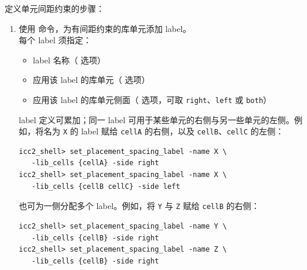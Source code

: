 定义单元间距约束的步骤：
\begin{enumerate}
  \item 使用  命令，为有间距约束的库单元添加 label。\\
        每个 label 须指定：
        \begin{itemize}
          \item label 名称（ 选项）
          \item 应用该 label 的库单元（ 选项）
          \item 应用该 label 的库单元侧面（ 选项，可取 \texttt{right}、\texttt{left} 或 \texttt{both}）
        \end{itemize}
        label 定义可累加；同一 label 可用于某些单元的右侧与另一些单元的左侧。例如，将名为 \texttt{X} 的 label 赋给 \texttt{cellA} 的右侧，以及 \texttt{cellB}、\texttt{cellC} 的左侧：
\begin{lstlisting}
icc2_shell> set_placement_spacing_label -name X \
   -lib_cells {cellA} -side right
icc2_shell> set_placement_spacing_label -name X \
   -lib_cells {cellB cellC} -side left
\end{lstlisting}
        也可为一侧分配多个 label。例如，将 \texttt{Y} 与 \texttt{Z} 赋给 \texttt{cellB} 的右侧：
\begin{lstlisting}
icc2_shell> set_placement_spacing_label -name Y \
   -lib_cells {cellB} -side right
icc2_shell> set_placement_spacing_label -name Z \
   -lib_cells {cellB} -side right
\end{lstlisting}


\end{enumerate}
